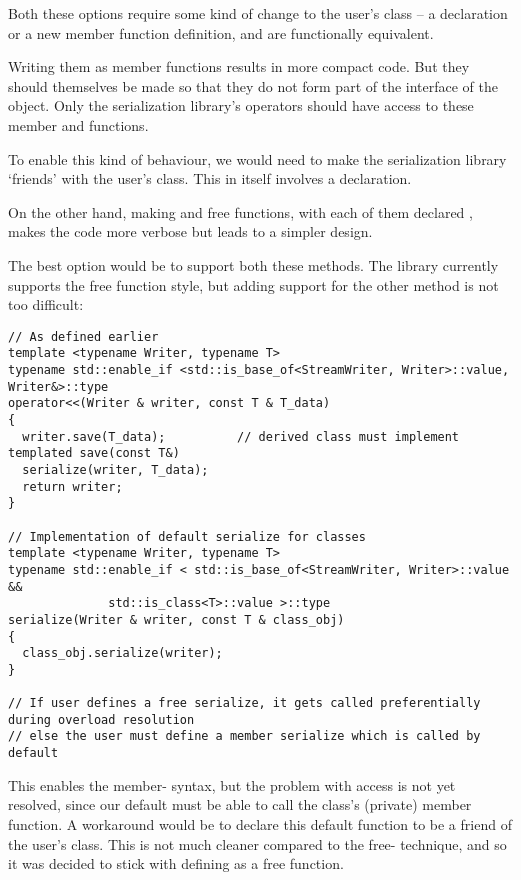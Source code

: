 \documentclass{article}
\begin{document}
Both these options require some kind of change to the user's class --
a  declaration or a new member function definition, and
are functionally equivalent.

Writing them as member functions results in more compact code. But
they should themselves be made  so that they do not form
part of the interface of the object. Only the serialization library's
operators should have access to these member  and
 functions.

To enable this kind of behaviour, we would need to make the
serialization library `friends' with the user's class. This in itself
involves a  declaration.

On the other hand, making  and  free
functions, with each of them declared , makes the code more
verbose but leads to a simpler design.

The best option would be to support both these methods. The library
currently supports the free  function style, but adding
support for the other method is not too difficult:

\begin{lstlisting}
// As defined earlier
template <typename Writer, typename T>
typename std::enable_if <std::is_base_of<StreamWriter, Writer>::value, Writer&>::type
operator<<(Writer & writer, const T & T_data)
{
  writer.save(T_data);          // derived class must implement templated save(const T&)
  serialize(writer, T_data);
  return writer;
}

// Implementation of default serialize for classes
template <typename Writer, typename T>
typename std::enable_if < std::is_base_of<StreamWriter, Writer>::value &&
			  std::is_class<T>::value >::type
serialize(Writer & writer, const T & class_obj)
{
  class_obj.serialize(writer);
}

// If user defines a free serialize, it gets called preferentially during overload resolution
// else the user must define a member serialize which is called by default
\end{lstlisting}

This enables the member- syntax, but the problem with
access is not yet resolved, since our default  must be
able to call the class's (private)  member function. A
workaround would be to declare this default  function
to be a friend of the user's class. This is not much cleaner compared
to the free- technique, and so it was decided to stick
with defining  as a free function.
\end{document}

